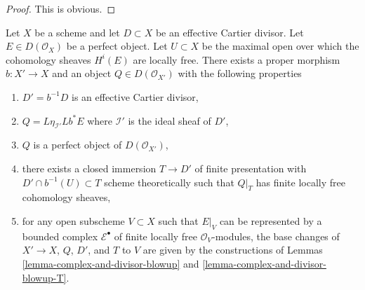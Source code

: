 \begin{proof}
This is obvious.
\end{proof}

\begin{lemma}
\label{lemma-complex-and-divisor-derived}
Let $X$ be a scheme and let $D \subset X$ be an effective Cartier divisor. Let
$E \in D(\mathcal{O}_X)$ be a perfect object. Let $U \subset X$ be the maximal
open over which the cohomology sheaves $H^i(E)$ are locally free.
There exists a proper morphism
$b : X' \longrightarrow X$ and an object $Q \in D(\mathcal{O}_{X'})$
with the following properties
\begin{enumerate}
\item $D' = b^{-1}D$ is an effective Cartier divisor,
\item $Q = L\eta_{\mathcal{I}'}Lb^*E$ where $\mathcal{I}'$
is the ideal sheaf of $D'$,
\item $Q$ is a perfect object of $D(\mathcal{O}_{X'})$,
\item there exists a closed immersion $T \to D'$ of finite presentation
with $D' \cap b^{-1}(U) \subset T$ scheme theoretically such that
$Q|_T$ has finite locally free cohomology sheaves,
\item for any open subscheme $V \subset X$ such that
$E|_V$ can be represented by a bounded complex $\mathcal{E}^\bullet$
of finite locally free $\mathcal{O}_V$-modules, the base changes
of $X' \to X$, $Q$, $D'$, and $T$ to $V$ are given by the
constructions of Lemmas \ref{lemma-complex-and-divisor-blowup} and
\ref{lemma-complex-and-divisor-blowup-T}.
\end{enumerate}
\end{lemma}

